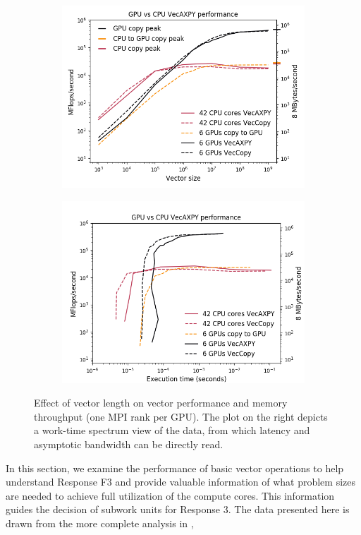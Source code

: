 \documentclass[10pt,journal,compsoc]{IEEEtran}
\begin{document}
\begin{figure}[ht]
    \centering
    \begin{subfigure}[t]{0.4 \textwidth}
    \vskip 0pt
    \includegraphics[width=\columnwidth]{figures/summitreport1/VecAXPY_CPU_vs_GPU.png}
    \end{subfigure}
    \begin{subfigure}[t]{0.4 \textwidth}
    \vskip 0pt
    \includegraphics[width=\columnwidth]{figures/summitreport1/jed_VecAXPY_CPU_vs_GPU.png}
    \end{subfigure}
    \caption{Effect of vector length on vector performance and memory throughput (one MPI rank per GPU).
    The plot on the right depicts a work-time spectrum view \cite{ChangPerformanceSpectrum,ChangTASSpectrum} of the data,
    from which latency and asymptotic bandwidth can be directly read.}
    \label{fig:vec_CPU_vs_GPU}
\end{figure}
%
In this section, we examine the performance of  basic vector operations to help understand Response F3 and
provide valuable information of what problem sizes are needed to achieve full utilization of the compute
cores. This information guides the decision of subwork units for Response 3.
The data presented here is drawn from the more complete analysis in \cite{osti_1614879},
\end{document}
